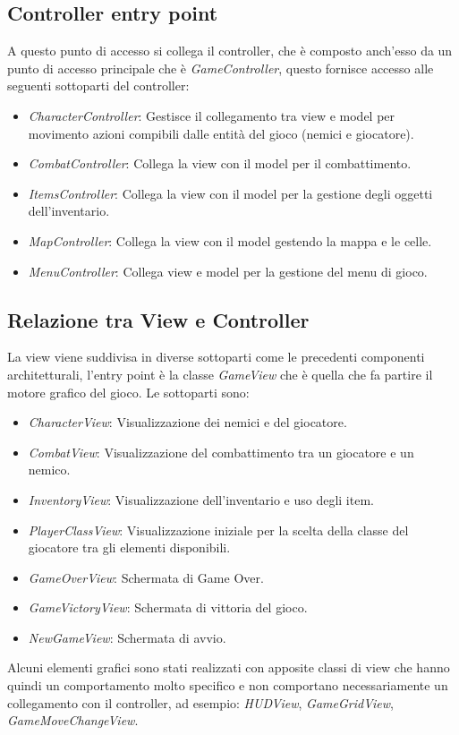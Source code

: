 \documentclass[a4paper,12pt]{report}
\begin{document}
\subsection{Controller entry point}
A questo punto di accesso si collega il controller, che è composto anch'esso da un punto di accesso principale che è \textit{GameController}, questo fornisce accesso alle seguenti sottoparti del controller:
\begin{itemize}
	\item \textit{CharacterController}: Gestisce il collegamento tra view e model per movimento azioni compibili dalle entità del gioco (nemici e giocatore).
	\item \textit{CombatController}: Collega la view con il model per il combattimento.
	\item \textit{ItemsController}: Collega la view con il model per la gestione degli oggetti dell'inventario.
	\item \textit{MapController}: Collega la view con il model gestendo la mappa e le celle.
	\item \textit{MenuController}: Collega view e model per la gestione del menu di gioco.
\end{itemize}
\subsection{Relazione tra View e Controller}
La view viene suddivisa in diverse sottoparti come le precedenti componenti architetturali, l'entry point è la classe \textit{GameView} che è quella che fa partire il motore grafico del gioco. Le sottoparti sono:
\begin{itemize}
	\item \textit{CharacterView}: Visualizzazione dei nemici e del giocatore.
	\item \textit{CombatView}: Visualizzazione del combattimento tra un giocatore e un nemico.
	\item \textit{InventoryView}: Visualizzazione dell'inventario e uso degli item.
	\item \textit{PlayerClassView}: Visualizzazione iniziale per la scelta della classe del giocatore tra gli elementi disponibili.
	\item \textit{GameOverView}: Schermata di Game Over.
	\item \textit{GameVictoryView}: Schermata di vittoria del gioco.
	\item \textit{NewGameView}: Schermata di avvio.
\end{itemize}
Alcuni elementi grafici sono stati realizzati con apposite classi di view che hanno quindi un comportamento molto specifico e non comportano necessariamente un collegamento con il controller, ad esempio: \textit{HUDView}, \textit{GameGridView}, \textit{GameMoveChangeView}.
\end{document}
